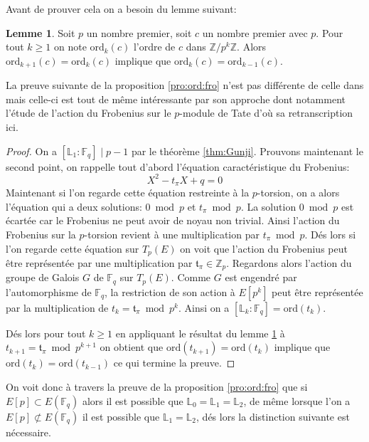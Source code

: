\documentclass[10pt,a4paper]{book}
\theoremstyle{plain}
\theoremstyle{definition}
\newtheorem{lem}[thm]{Lemme}
\theoremstyle{definition}
\theoremstyle{definition}
\theoremstyle{definition}
\theoremstyle{remark}
\theoremstyle{remark}
\begin{document}
Avant de prouver cela on a besoin du lemme suivant:

\begin{lem}
\label{lem:ord}
Soit $p$ un nombre premier, soit $c$ un nombre premier avec $p$. Pour tout $k \geqslant 1$ on note $\mathrm{ord}_k(c)$ l'ordre de $c$ dans $\mathbb{Z}/p^k\mathbb{Z}$. Alors $\mathrm{ord}_{k+1}(c)=\mathrm{ord}_k(c)$ implique que $\mathrm{ord}_k(c) = \mathrm{ord}_{k-1}(c)$.
\end{lem}

La preuve suivante de la proposition \ref{pro:ord:fro} n'est pas différente de celle dans \cite[Proposition 5]{DeFeo11} mais celle-ci est tout de même intéressante par son approche dont notamment l'étude de l'action du Frobenius sur le $p$-module de Tate d'où sa retranscription ici.

\begin{proof}
On a $[\mathbb{L}_1:\mathbb{F}_q] \mid p-1$ par le théorème \ref{thm:Gunji}. Prouvons maintenant le second point,
on rappelle tout d'abord l'équation caractéristique du Frobenius:
\begin{equation}
X^2 - t_{\pi}X + q = 0
\end{equation}
Maintenant si l'on regarde cette équation restreinte à la $p$-torsion, on a alors l'équation qui a deux solutions: $0 \bmod p$ et $t_{\pi} \bmod p$. La solution $0 \bmod p$ est écartée car le Frobenius ne peut avoir de noyau non trivial. Ainsi l'action du Frobenius sur la $p$-torsion revient à une multiplication par $t_{\pi} \bmod p$. Dés lors si l'on regarde cette équation sur $T_{p}(E)$ on voit que l'action du Frobenius peut être représentée par une multiplication par $\mathfrak{t}_{\pi} \in \mathbb{Z}_{p} $. 
Regardons alors l'action du groupe de Galois $G$ de $\mathbb{F}_q$ sur $T_{p}(E)$. Comme $G$ est engendré par l'automorphisme de $\mathbb{F}_q$, la restriction de son action à $E[p^k]$ peut être représentée par la multiplication de $t_k=\mathfrak{t}_{\pi} \bmod p^k$. Ainsi on a $[\mathbb{L}_k:\mathbb{F}_q]=\mathrm{ord}(t_k)$.

Dés lors pour tout $k\geqslant 1$ en appliquant le résultat du lemme \ref{lem:ord} à $t_{k+1}=\mathfrak{t}_{\pi} \bmod p^{k+1}$ on obtient que $\mathrm{ord}(t_{k+1})=\mathrm{ord}(t_{k})$ implique que $\mathrm{ord}(t_{k})=\mathrm{ord}(t_{k-1})$ ce qui termine la preuve.
\end{proof}

On voit donc à travers la preuve de la proposition \ref{pro:ord:fro} que si $E[p] \subset E(\mathbb{F}_q)$ alors il est possible que $\mathbb{L}_0=\mathbb{L}_1=\mathbb{L}_2$, de même lorsque l'on a $E[p] \not\subset E(\mathbb{F}_q)$ il est possible que $\mathbb{L}_1=\mathbb{L}_2$, dés lors la distinction suivante est nécessaire.
\end{document}
